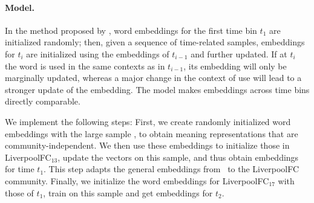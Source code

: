 \paragraph{Model.}
In the method proposed by , word
embeddings for the first time bin $t_1$ are initialized randomly; then,
given a sequence of time-related samples, embeddings for $t_i$
are initialized using the embeddings of $t_{i-1}$ and further
updated. 
If at $t_i$ the word is used in the same contexts as in $t_{i-1}$, its embedding will only be marginally updated, whereas a major change in the context of use will lead to a stronger update of the embedding. The model makes embeddings across time bins directly comparable.

We implement the following steps:
First, we create  randomly initialized word embeddings with the large sample \redd, to obtain meaning
representations that are community-independent.
We then use these embeddings
to initialize those in LiverpoolFC$_{13}$, update the vectors on this
sample, and thus obtain embeddings for time $t_1$. This step
adapts the general embeddings from \redd\  to the
LiverpoolFC community. Finally, we
initialize the word embeddings for LiverpoolFC$_{17}$ with those of
$t_1$, train on this sample and get embeddings for $t_2$.


